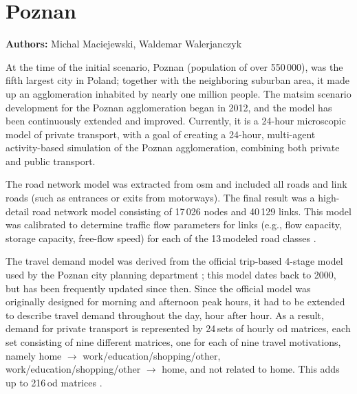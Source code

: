 \section{Poznan}
\label{sec:poznan}
\hfill \textbf{Authors:} Michal Maciejewski, Waldemar Walerjanczyk


At the time of the initial scenario, Poznan (population of over 550\,000), was the fifth largest city in Poland; together with the neighboring suburban area, it made up an agglomeration inhabited by nearly one million people. The \gls{matsim} scenario development for the Poznan agglomeration began in 2012, and the model has been continuously extended and improved. Currently, it is a 24-hour microscopic model of private transport, with a goal of creating a 24-hour, multi-agent activity-based simulation of the Poznan agglomeration, combining both private and public transport.

The road network model was extracted from \gls{osm} and included all roads and link roads (such as entrances or exits from motorways). The final result was a high-detail road network model consisting of 17\,026 nodes and 40\,129 links. This model was calibrated to determine traffic flow parameters for links (e.g., flow capacity, storage capacity, free-flow speed) for each of the 13\,modeled road classes \citep{PiatkowskiMaciejewski2012osmNetwork}.

The travel demand model was derived from the official trip-based 4-stage model used by the Poznan city planning department ; this model dates back to 2000, but has been frequently updated since then. Since the official model was originally designed for morning and afternoon peak hours, it had to be extended to describe travel demand throughout the day, hour after hour. As a result, demand for private transport is represented by 24\,sets of hourly \gls{od} matrices, each set consisting of nine different matrices, one for each of nine travel motivations, namely home $\rightarrow$ work/education/shopping/other, work/education/shopping/other $\rightarrow$ home, and not related to home. This adds up to 216\,\gls{od} matrices \citep{PiatkowskiEtAl2013Poznan24hSimulation, MaciejewskiEtAl2014MikroMakro}.

